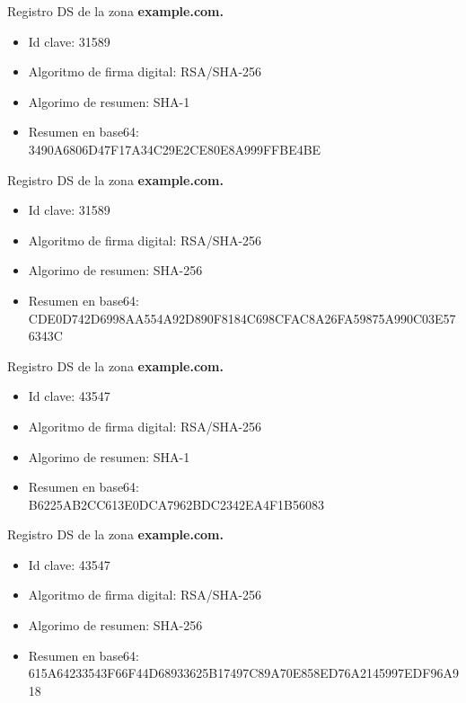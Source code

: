 \documentclass[11pt]{article}
\begin{document}
\medskip

Registro DS de la zona \textbf{example.com.}

\begin{itemize}
  \item Id clave: 31589
  \item Algoritmo de firma digital: RSA/SHA-256
  \item Algorimo de resumen: SHA-1
  \item Resumen en base64:\\
    3490A6806D47F17A34C29E2CE80E8A999FFBE4BE
\end{itemize}

\medskip

Registro DS de la zona \textbf{example.com.}

\begin{itemize}
  \item Id clave: 31589
  \item Algoritmo de firma digital: RSA/SHA-256
  \item Algorimo de resumen: SHA-256
  \item Resumen en base64:\\
    CDE0D742D6998AA554A92D890F8184C698CFAC8A26FA59875A990C03E576343C
\end{itemize}

\medskip

Registro DS de la zona \textbf{example.com.}

\begin{itemize}
  \item Id clave: 43547
  \item Algoritmo de firma digital: RSA/SHA-256
  \item Algorimo de resumen: SHA-1
  \item Resumen en base64:\\
    B6225AB2CC613E0DCA7962BDC2342EA4F1B56083
\end{itemize}

\medskip

Registro DS de la zona \textbf{example.com.}

\begin{itemize}
  \item Id clave: 43547
  \item Algoritmo de firma digital: RSA/SHA-256
  \item Algorimo de resumen: SHA-256
  \item Resumen en base64:\\
    615A64233543F66F44D68933625B17497C89A70E858ED76A2145997EDF96A918
\end{itemize}
\end{document}

